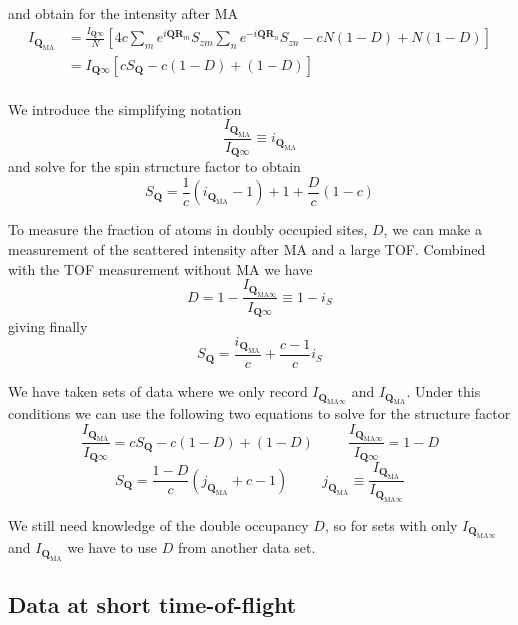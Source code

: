 \documentclass[11pt,letter]{article}
\newcommand{\bv}[1]{\ensuremath{\bm{#1}}}
\newcommand{\Iqtof}{\ensuremath{I_{\bv{Q}\infty} }}
\newcommand{\Iqma}{\ensuremath{I_{\bv{Q}_{\text{MA}}} }}
\newcommand{\iqma}{\ensuremath{i_{\bv{Q}_{\text{MA}}} }}
\newcommand{\jqma}{\ensuremath{j_{\bv{Q}_{\text{MA}}} }}
\newcommand{\Iqmatof}{\ensuremath{I_{\bv{Q}_{\text{MA}\infty}} }}
\newcommand{\is}{\ensuremath{i_{S}} }
\begin{document}
and obtain for the intensity after MA 
\begin{equation}
\begin{split} 
 \Iqma
&  = \frac{ \Iqtof }{N} 
  \left[ 
      4 c \sum_{m}  
      e^{ i \bv{Q} \bv{R}_{m} } S_{zm} 
      \sum_{n } 
      e^{ -i \bv{Q} \bv{R}_{n} } S_{zn} 
    -  c N(1-D)  + N(1-D) 
   \right]  \\ 
&  =  \Iqtof 
  \left[ c S_{\bv{Q}}
    -  c (1-D)  + (1-D) 
   \right]  \\ 
\end{split}
\end{equation}

We introduce the simplifying notation
\begin{equation}
 \frac{  \Iqma } { \Iqtof } \equiv \iqma  
\end{equation}
and solve for the spin structure factor to obtain
\begin{equation}
S_{\bv{Q}} = \frac{1}{c}\left( \iqma  - 1 \right)
             + 1 + \frac{D}{c}(1-c) 
\end{equation}

To measure the fraction of atoms in doubly occupied sites, $D$, we can make a
measurement of the scattered intensity after MA and a large TOF.  Combined with
the TOF measurement without MA we have 
\begin{equation}
  D = 1 - \frac{\Iqmatof }{ \Iqtof } \equiv 1 - \is 
\end{equation} 
giving finally 
\begin{equation}
S_{\bv{Q}} = \frac{\iqma}{c} + \frac{c-1}{c} \is 
\end{equation}

We have taken sets of data where we only record $\Iqmatof$ and $\Iqma$. Under
this conditions we can use the following two equations to solve for the
structure factor
\begin{equation} 
\frac{\Iqma }{\Iqtof}  = cS_{\bv{Q}} - c(1-D) + (1-D)
\ \ \ \ \ \ \ \ \ \ \ 
\frac{ \Iqmatof }{\Iqtof}  =  1 -D 
\end{equation} 
\begin{equation}
S_{\bv{Q}} = \frac{1-D}{c} ( \jqma + c - 1 )  
\ \ \ \ \ \ \ \ \ \ \ 
\jqma \equiv  \frac{\Iqma}{\Iqmatof} 
\end{equation}

We still need knowledge of the double occupancy $D$, so for sets with only
$\Iqmatof$ and $\Iqma$ we have to use $D$ from another data set.

\subsection{Data at short time-of-flight} 
\end{document}
